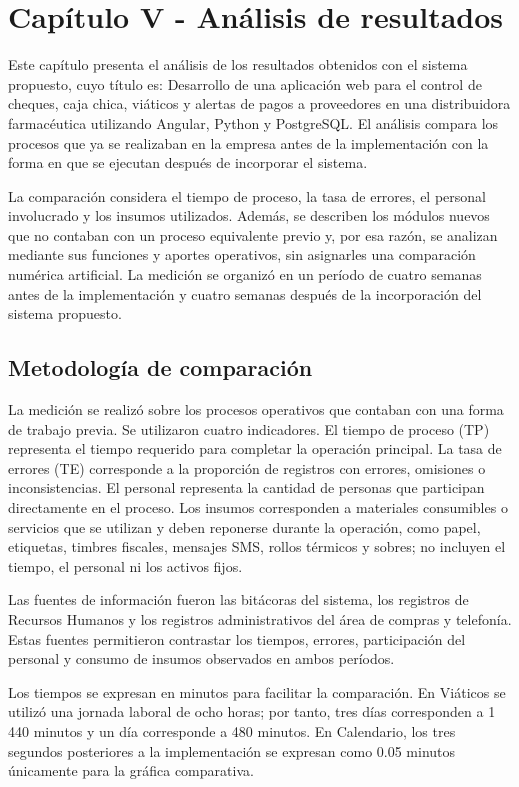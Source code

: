 \section{Capítulo V - Análisis de resultados}

Este capítulo presenta el análisis de los resultados obtenidos con el sistema propuesto, cuyo título es: Desarrollo de una aplicación web para el control de cheques, caja chica, viáticos y alertas de pagos a proveedores en una distribuidora farmacéutica utilizando Angular, Python y PostgreSQL. El análisis compara los procesos que ya se realizaban en la empresa antes de la implementación con la forma en que se ejecutan después de incorporar el sistema.

La comparación considera el tiempo de proceso, la tasa de errores, el personal involucrado y los insumos utilizados. Además, se describen los módulos nuevos que no contaban con un proceso equivalente previo y, por esa razón, se analizan mediante sus funciones y aportes operativos, sin asignarles una comparación numérica artificial. La medición se organizó en un período de cuatro semanas antes de la implementación y cuatro semanas después de la incorporación del sistema propuesto.

\subsection*{Metodología de comparación}

La medición se realizó sobre los procesos operativos que contaban con una forma de trabajo previa. Se utilizaron cuatro indicadores. El tiempo de proceso (TP) representa el tiempo requerido para completar la operación principal. La tasa de errores (TE) corresponde a la proporción de registros con errores, omisiones o inconsistencias. El personal representa la cantidad de personas que participan directamente en el proceso. Los insumos corresponden a materiales consumibles o servicios que se utilizan y deben reponerse durante la operación, como papel, etiquetas, timbres fiscales, mensajes SMS, rollos térmicos y sobres; no incluyen el tiempo, el personal ni los activos fijos.

Las fuentes de información fueron las bitácoras del sistema, los registros de Recursos Humanos y los registros administrativos del área de compras y telefonía. Estas fuentes permitieron contrastar los tiempos, errores, participación del personal y consumo de insumos observados en ambos períodos.

Los tiempos se expresan en minutos para facilitar la comparación. En Viáticos se utilizó una jornada laboral de ocho horas; por tanto, tres días corresponden a 1\,440 minutos y un día corresponde a 480 minutos. En Calendario, los tres segundos posteriores a la implementación se expresan como 0.05 minutos únicamente para la gráfica comparativa.

